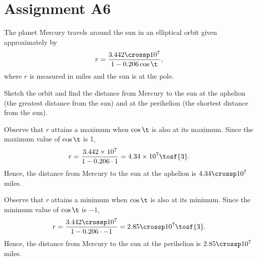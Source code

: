 \clearpage
\section{Assignment A6}

\begin{problem}
    The planet Mercury travels around the sun in an elliptical orbit given approximately by \[r = \dfrac{3.442 \crossp 10^7}{1 - 0.206\cos\t},\] where $r$ is measured in miles and the sun is at the pole.

    Sketch the orbit and find the distance from Mercury to the sun at the aphelion (the greatest distance from the sun) and at the perihelion (the shortest distance from the sun).
\end{problem}
\begin{solution}
    \begin{center}
    \end{center}

    Observe that $r$ attains a maximum when $\cos \t$ is also at its maximum. Since the maximum value of $\cos \t$ is 1, \[r = \dfrac{3.442 \times 10^7}{1 - 0.206\cdot1} = 4.34 \times 10^7 \tosf{3}.\] Hence, the distance from Mercury to the sun at the aphelion is $4.34 \crossp 10^7$ miles.

    Observe that $r$ attains a minimum when $\cos \t$ is also at its minimum. Since the minimum value of $\cos \t$ is $-1$, \[r = \dfrac{3.442 \crossp 10^7}{1 - 0.206\cdot-1} = 2.85 \crossp 10^7 \tosf{3}.\] Hence, the distance from Mercury to the sun at the perihelion is $2.85 \crossp 10^7$ miles.
\end{solution}

